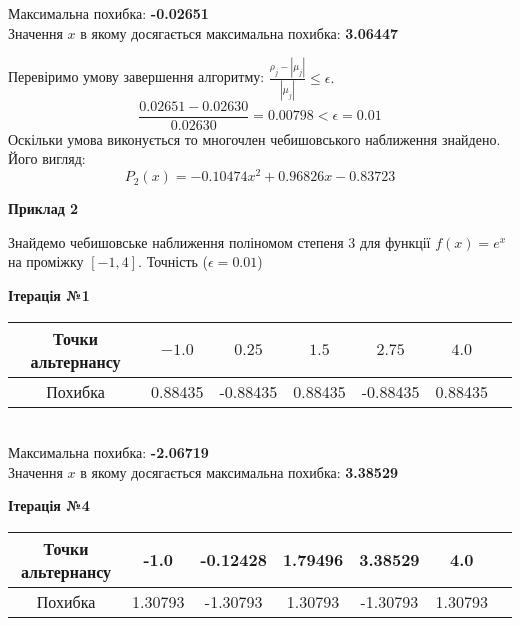 \documentclass[ukrainian,14pt]{extarticle}
\begin{document}
\noindent
Максимальна похибка: \textbf{-\textsc{0.02651}}\\
Значення $x$ в якому досягається максимальна похибка: \textbf{3.06447}

\newpage

Перевіримо умову завершення алгоритму: $\frac{\rho_j - |\mu_j|}{|\mu_j|} \leq \epsilon.$ \\

$$\frac{0.02651 - 0.02630}{0.02630} = 0.00798 < \epsilon = 0.01$$
Оскільки умова виконується  то многочлен чебишовського наближення знайдено. Його вигляд:\\
$$P_2(x) = -0.10474 x^{2} + 0.96826x - 0.83723$$



\newpage


\textbf{Приклад 2} 	

Знайдемо чебишовське наближення поліномом степеня 3 для функції $f(x) = e^{x}$ на проміжку $[-1, 4]$. Точність ($\epsilon = 0.01$)

\begin{center}
\textbf{Ітерація №1}
\end{center}

\begin{tabular}{|c|c|c|c|c|c|c}
\hline
\rule{0pt}{4ex}
Точки альтернансу & $-1.0$ & $0.25$ & $1.5$ & $2.75$ & $4.0$ \\ \hline
\rule{0pt}{4ex} 
Похибка & 0.88435 & -0.88435 & 0.88435 & -0.88435 & 0.88435  \\ \hline 
\end{tabular}\\

\noindent
Максимальна похибка: \textbf{-2.06719}\\
Значення $x$ в якому досягається максимальна похибка: \textbf{3.38529}


\newpage

\begin{center}
\textbf{Ітерація №4}
\end{center}


\begin{tabular}{|c|c|c|c|c|c|c}
\hline
\rule{0pt}{4ex} 
Точки альтернансу & -1.0 & -0.12428 & 1.79496 & 3.38529 & 4.0 \\\hline
\rule{0pt}{4ex} 
Похибка & 1.30793 & -1.30793 & 1.30793 & -1.30793 & 1.30793  \\ \hline 
\end{tabular}\\
\end{document}
